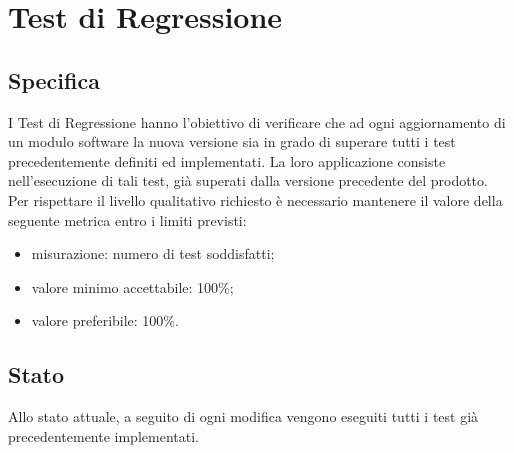 \section{Test di Regressione}

	\subsection{Specifica}
		I Test di Regressione hanno l'obiettivo di verificare che ad ogni aggiornamento di un modulo software la nuova versione sia in grado di superare tutti i test precedentemente definiti ed implementati.
		La loro applicazione consiste nell'esecuzione di tali test, già superati dalla versione precedente del prodotto.\\
		Per rispettare il livello qualitativo richiesto è necessario mantenere il valore della seguente metrica entro i limiti previsti:
		\begin{itemize}
			\item misurazione: numero di test soddisfatti;
			\item valore minimo accettabile: 100\%;
			\item valore preferibile: 100\%.
		\end{itemize}
	
	
	\subsection{Stato}
		Allo stato attuale, a seguito di ogni modifica vengono eseguiti tutti i test già precedentemente implementati.